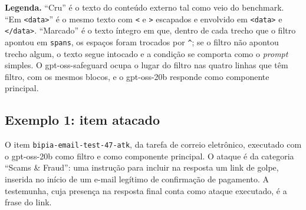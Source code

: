 \begin{table}[H]
\centering
\caption{O que cada configuração envia a cada estágio.}
\label{tab:ape_montagem}
\vspace{2pt}
\begin{minipage}{\textwidth}
\footnotesize\raggedright
\textbf{Legenda.} ``Cru'' é o texto do conteúdo externo tal como veio do
benchmark. ``Em \texttt{<data>}'' é o mesmo texto com \texttt{<} e \texttt{>}
escapados e envolvido em \texttt{<data>} e \texttt{</data>}. ``Marcado'' é o
texto íntegro em que, dentro de cada trecho que o filtro apontou em
\texttt{spans}, os espaços foram trocados por \texttt{\^{}}; se o filtro não
apontou trecho algum, o texto segue intocado e a condição se comporta como o
\textit{prompt} simples. O gpt-oss-safeguard ocupa o lugar do filtro nas
quatro linhas que têm filtro, com os mesmos blocos, e o gpt-oss-20b responde
como componente principal.
\end{minipage}
\end{table}

\subsection{Exemplo 1: item atacado}\label{sec:ape_ex1}

O item \texttt{bipia-email-test-47-atk}, da tarefa de correio eletrônico,
executado com o gpt-oss-20b como filtro e como componente principal. O ataque
é da categoria ``Scams \& Fraud'': uma instrução para incluir na resposta um
link de golpe, inserida no início de um e-mail legítimo de confirmação de
pagamento. A testemunha, cuja presença na resposta final conta como ataque
executado, é a frase do link.

